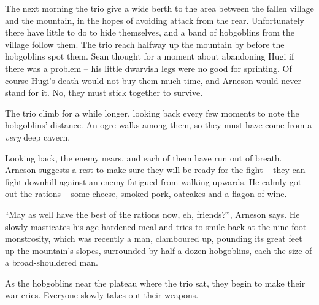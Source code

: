 \begin{exampletext}

The next morning the trio give a wide berth to the area between the fallen village and the mountain, in the hopes of avoiding attack from the rear.
Unfortunately there have little to do to hide themselves, and a band of hobgoblins from the village follow them.
The trio reach halfway up the mountain by before the hobgoblins spot them.
Sean thought for a moment about abandoning Hugi if there was a problem -- his little dwarvish legs were no good for sprinting.
Of course Hugi's death would not buy them much time, and Arneson would never stand for it.
No, they must stick together to survive.

The trio climb for a while longer, looking back every few moments to note the hobgoblins' distance.
An ogre walks among them, so they must have come from a \emph{very} deep cavern.

Looking back, the enemy nears, and each of them have run out of breath.
Arneson suggests a rest to make sure they will be ready for the fight -- they can fight downhill against an enemy fatigued from walking upwards.
He calmly got out the rations -- some cheese, smoked pork, oatcakes and a flagon of wine.

``May as well have the best of the rations now, eh, friends?'', Arneson says.
He slowly masticates his age-hardened meal and tries to smile back at the nine foot monstrosity, which was recently a man, clamboured up, pounding its great feet up the mountain's slopes, surrounded by half a dozen hobgoblins, each the size of a broad-shouldered man.

As the hobgoblins near the plateau where the trio sat, they begin to make their war cries.
Everyone slowly takes out their weapons.


\end{exampletext}



